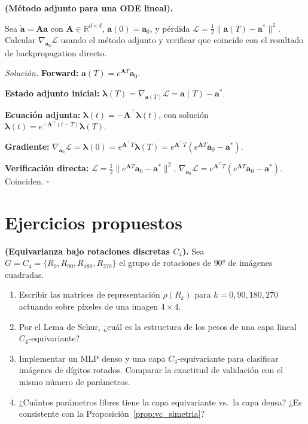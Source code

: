 \begin{ejercicio}
\label{ej:adj_lineal}
\textbf{(Método adjunto para una ODE lineal).}

Sea $\dot{\bm{a}} = \bm{A}\bm{a}$ con $\bm{A} \in \mathbb{R}^{d\times d}$,
$\bm{a}(0) = \bm{a}_0$, y pérdida $\mathcal{L} = \frac{1}{2}\|\bm{a}(T)-
\bm{a}^*\|^2$. Calcular $\nabla_{\bm{a}_0}\mathcal{L}$ usando el método
adjunto y verificar que coincide con el resultado de backpropagation directo.

\medskip\noindent\textit{Solución.}
\textbf{Forward:} $\bm{a}(T) = e^{\bm{A}T}\bm{a}_0$.

\textbf{Estado adjunto inicial:}
$\bm{\lambda}(T) = \nabla_{\bm{a}(T)}\mathcal{L} = \bm{a}(T)-\bm{a}^*$.

\textbf{Ecuación adjunta:}
$\dot{\bm{\lambda}}(t) = -\bm{A}^\top\bm{\lambda}(t)$,
con solución $\bm{\lambda}(t) = e^{-\bm{A}^\top(t-T)}\bm{\lambda}(T)$.

\textbf{Gradiente:}
$\nabla_{\bm{a}_0}\mathcal{L} = \bm{\lambda}(0) = e^{\bm{A}^\top T}\bm{\lambda}(T)
= e^{\bm{A}^\top T}(e^{\bm{A}T}\bm{a}_0-\bm{a}^*)$.

\textbf{Verificación directa:}
$\mathcal{L} = \frac{1}{2}\|e^{\bm{A}T}\bm{a}_0-\bm{a}^*\|^2$,
$\nabla_{\bm{a}_0}\mathcal{L} = e^{\bm{A}^\top T}(e^{\bm{A}T}\bm{a}_0-\bm{a}^*)$.
Coinciden. $\square$
\end{ejercicio}

\section*{Ejercicios propuestos}

\begin{ejercicio}
\textbf{(Equivarianza bajo rotaciones discretas $C_4$).}
Sea $G = C_4 = \{R_0, R_{90}, R_{180}, R_{270}\}$ el grupo de rotaciones de
$90°$ de imágenes cuadradas.
\begin{enumerate}[label=(\alph*)]
  \item Escribir las matrices de representación $\rho(R_k)$ para
        $k = 0, 90, 180, 270$ actuando sobre píxeles de una imagen $4\times 4$.
  \item Por el Lema de Schur, ¿cuál es la estructura de los pesos de una capa
        lineal $C_4$-equivariante?
  \item Implementar un MLP denso y una capa $C_4$-equivariante para clasificar
        imágenes de dígitos rotados. Comparar la exactitud de validación con
        el mismo número de parámetros.
  \item ¿Cuántos parámetros libres tiene la capa equivariante vs.\ la capa
        densa? ¿Es consistente con la Proposición~\ref{prop:vc_simetria}?
\end{enumerate}
\end{ejercicio}

